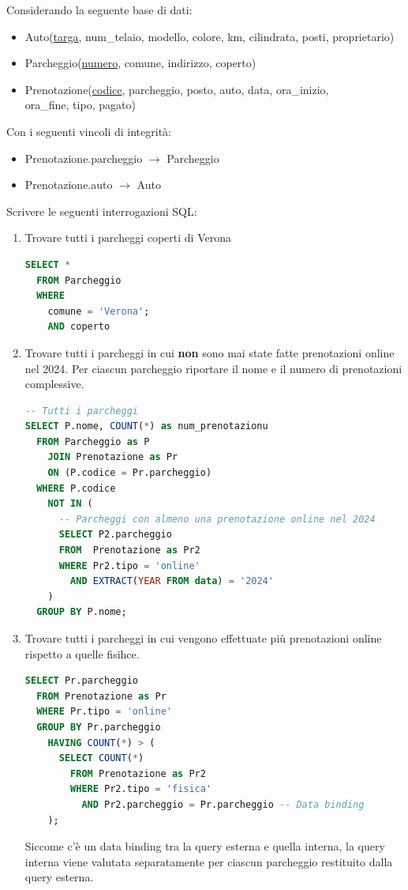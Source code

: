 \documentclass[a4paper,twoside]{article}
\begin{document}
\begin{exercise}
  \label{exercise:parcheggi}
  Considerando la seguente base di dati:
  \begin{itemize}
    \item Auto(\underline{targa}, num\_telaio, modello, colore, km, cilindrata, posti,
      proprietario)

    \item Parcheggio(\underline{numero}, comune, indirizzo, coperto)

    \item Prenotazione(\underline{codice}, parcheggio, posto, auto, data, ora\_inizio,\\
      ora\_fine, tipo, pagato)
  \end{itemize}
  \noindent
  Con i seguenti vincoli di integrità:
  \begin{itemize}
    \item Prenotazione.parcheggio $\to$ Parcheggio
    \item Prenotazione.auto $\to$ Auto
  \end{itemize}
  \noindent
  Scrivere le seguenti interrogazioni SQL:
  \begin{enumerate}
    \item Trovare tutti i parcheggi coperti di Verona
\begin{lstlisting}[language=SQL]
SELECT *
  FROM Parcheggio
  WHERE 
    comune = 'Verona';
    AND coperto
\end{lstlisting}

    \item Trovare tutti i parcheggi in cui \textbf{non} sono mai state fatte
      prenotazioni online nel 2024. Per ciascun parcheggio riportare il nome
      e il numero di prenotazioni complessive.
\begin{lstlisting}[language=SQL]
-- Tutti i parcheggi
SELECT P.nome, COUNT(*) as num_prenotazionu
  FROM Parcheggio as P
    JOIN Prenotazione as Pr
    ON (P.codice = Pr.parcheggio)
  WHERE P.codice
    NOT IN (
      -- Parcheggi con almeno una prenotazione online nel 2024
      SELECT P2.parcheggio
      FROM  Prenotazione as Pr2
      WHERE Pr2.tipo = 'online'
        AND EXTRACT(YEAR FROM data) = '2024'
    )
  GROUP BY P.nome;
\end{lstlisting}

    \item Trovare tutti i parcheggi in cui vengono effettuate più prenotazioni online
      rispetto a quelle fisihce.
\begin{lstlisting}[language=SQL]
SELECT Pr.parcheggio
  FROM Prenotazione as Pr
  WHERE Pr.tipo = 'online'
  GROUP BY Pr.parcheggio
    HAVING COUNT(*) > (
      SELECT COUNT(*)
        FROM Prenotazione as Pr2
        WHERE Pr2.tipo = 'fisica'
          AND Pr2.parcheggio = Pr.parcheggio -- Data binding
    );
\end{lstlisting}
    Siccome c'è un data binding tra la query esterna e quella interna, la query interna
    viene valutata separatamente per ciascun parcheggio restituito dalla query esterna.

  \end{enumerate}
\end{exercise}
\end{document}
